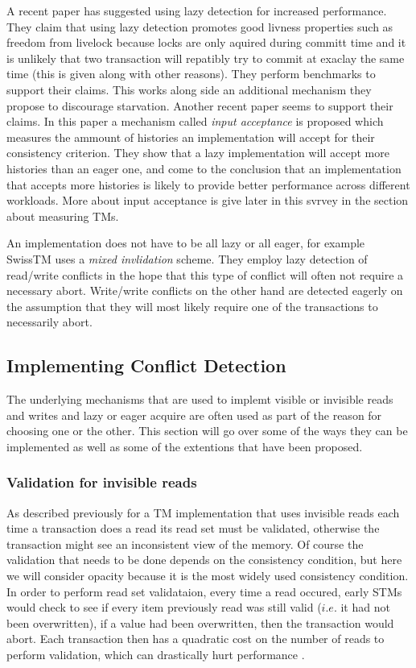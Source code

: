 A recent paper \cite{1504199} has suggested using lazy detection for increased performance.
They claim that using lazy detection promotes good livness properties such as freedom from livelock because locks are only aquired during committ time and it is unlikely that two transaction will repatibly try to commit at exaclay the same time (this is given along with other reasons).
They perform benchmarks to support their claims.
This works along side an additional mechanism they propose to discourage starvation.
Another recent paper \cite{LPD-ARTICLE-2009-004} seems to support their claims.
In this paper a mechanism called \emph{input acceptance} is proposed which measures the ammount of histories an implementation will accept for their consistency criterion.
They show that a lazy implementation will accept more histories than an eager one, and come to the conclusion that an implementation that accepts more histories is likely to provide better performance across different workloads.
More about input acceptance is give later in this svrvey in the section about measuring TMs.

An implementation does not have to be all lazy or all eager, for example SwissTM \cite{1542494} uses a \emph{mixed invlidation} scheme.
They employ lazy detection of read/write conflicts in the hope that this type of conflict will often not require a necessary abort.
Write/write conflicts on the other hand are detected eagerly on the assumption that they will most likely require one of the transactions to necessarily abort.


\subsection{Implementing Conflict Detection}
The underlying mechanisms that are used to implemt visible or invisible reads and writes and lazy or eager acquire are often used as part of the reason for choosing one or the other.  This section will go over some of the ways they can be implemented as well as some of the extentions that have been proposed.

\subsubsection{Validation for invisible reads}
As described previously for a TM implementation that uses invisible reads each time a transaction does a read its read set must be validated, otherwise the transaction might see an inconsistent view of the memory.
Of course the validation that needs to be done depends on the consistency condition, but here we will consider opacity because it is the most widely used  consistency condition.
In order to perform read set validataion, every time a read occured, early STMs would check to see if every item previously read was still valid ($i.e.$ it had not been overwritten), if a value had been overwritten, then the transaction would abort.
Each transaction then has a quadratic cost on the number of reads to perform validation, which can drastically hurt performance \cite{10.1109/TPDS.2010.49}.

